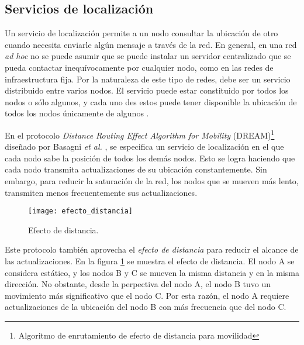 \subsection{Servicios de localización}
\label{subsec:servicios_de_localizacion}

Un servicio de localización permite a un nodo consultar la ubicación de otro
cuando necesita enviarle algún mensaje a través de la red. En general, en una
red \textit{ad hoc} no se puede asumir que se puede instalar un servidor
centralizado que se pueda contactar inequívocamente por cualquier nodo, como en
las redes de infraestructura fija. Por la naturaleza de este tipo de redes, debe
ser un servicio distribuido entre varios nodos. El servicio puede estar
constituido por todos los nodos o sólo algunos, y cada uno des estos puede
tener disponible la ubicación de todos los nodos únicamente de algunos
\cite{DeMoraisCordeiro2006}.

En el protocolo \textit{Distance Routing Effect Algorithm for Mobility}
(DREAM)\footnote{Algoritmo de enrutamiento de efecto de distancia para
movilidad} diseñado por Basagni \textit{et al.} \cite{Basagni1998}, se
especifica un servicio de localización en el que cada nodo sabe la posición de
todos los demás nodos. Esto se logra haciendo que cada nodo transmita
actualizaciones de su ubicación constantemente. Sin embargo, para reducir la
saturación de la red, los nodos que se mueven más lento, transmiten menos
frecuentemente sus actualizaciones.

\begin{figure}[th]
\centering
\texttt{[image: efecto\_distancia]}
\decoRule
\caption[Efecto de distancia]{Efecto de distancia\protect\footnotemark.}
\label{fig:efecto_distancia}
\end{figure}


Este protocolo también aprovecha el \textit{efecto de distancia} para reducir el
alcance de las actualizaciones. En la figura \ref{fig:efecto_distancia} se
muestra el efecto de distancia. El nodo A se considera estático, y los nodos B
y C se mueven la misma distancia y en la misma dirección. No obstante, desde la
perpectiva del nodo A, el nodo B tuvo un movimiento más significativo que el
nodo C. Por esta razón, el nodo A requiere actualizaciones de la ubicación del
nodo B con más frecuencia que del nodo C.

